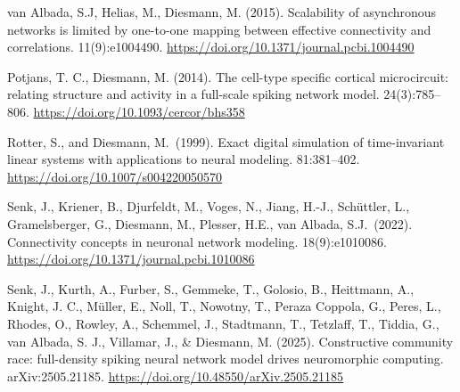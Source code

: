 \documentclass[10pt,a4paper,twoside,american]{article}
\theoremstyle{definitionstyle}
\begin{document}
{}
\begin{thebibliography}{}

  van Albada, S.J, Helias, M., Diesmann, M. (2015).
  \newblock Scalability of asynchronous networks is limited by one-to-one mapping between effective connectivity and correlations.
   11(9):e1004490.
  \newblock \url{https://doi.org/10.1371/journal.pcbi.1004490}
    
  Potjans, T. C., Diesmann, M. (2014).
  \newblock The cell-type specific cortical microcircuit: relating structure and activity in a full-scale spiking network model. 
   24(3):785–806.
  \newblock \url{https://doi.org/10.1093/cercor/bhs358}

  Rotter, S., and Diesmann, M.~(1999).
  \newblock Exact digital simulation of time-invariant linear systems with applications to neural modeling.
   81:381--402.
  \newblock \url{https://doi.org/10.1007/s004220050570}

  Senk, J., Kriener, B., Djurfeldt, M., Voges, N., Jiang, H.-J., Sch\"uttler, L., Gramelsberger, G., Diesmann, M., Plesser, H.E., van Albada, S.J.~(2022).
  \newblock Connectivity concepts in neuronal network modeling.
   18(9):e1010086.
  \newblock \url{https://doi.org/10.1371/journal.pcbi.1010086}
  
  Senk, J., Kurth, A., Furber, S., Gemmeke, T., Golosio, B., Heittmann, A., Knight, J. C., M\"uller, E., Noll, T., Nowotny, T., Peraza Coppola, G., Peres, L., Rhodes, O., Rowley, A., Schemmel, J., Stadtmann, T., Tetzlaff, T., Tiddia, G., van Albada, S. J., Villamar, J., \& Diesmann, M. (2025). 
  \newblock Constructive community race: full-density spiking neural network model drives neuromorphic computing.
  \newblock arXiv:2505.21185.
  \newblock \url{https://doi.org/10.48550/arXiv.2505.21185}  
\end{thebibliography}
\end{document}
